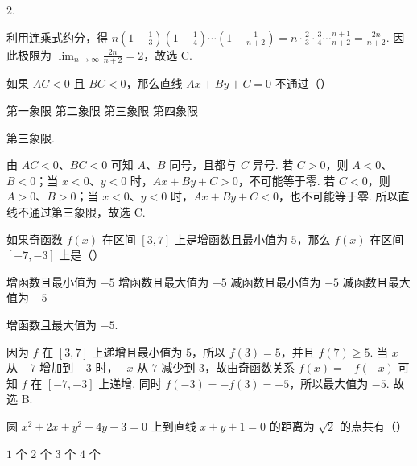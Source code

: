 \documentclass[UTF8,a4paper,oneside,11pt]{ctexbook}
\begin{document}
\begin{answer}
\(2\).
\end{answer}

\begin{solution}
利用连乘式约分，得
\(n\left(1-\frac13\right)\left(1-\frac14\right)\cdots\left(1-\frac1{n+2}\right)=n\cdot\frac23\cdot\frac34\cdots\frac{n+1}{n+2}=\frac{2n}{n+2}\). 因此极限为 \(\displaystyle\lim_{n\to\infty}\frac{2n}{n+2}=2\)，故选 C.
\end{solution}

\begin{problem}
如果 \(AC < 0\) 且 \(BC < 0\)，那么直线 \(Ax + By + C = 0\) 不通过（\quad）

\choices
    {第一象限}
    {第二象限}
    {第三象限}
    {第四象限}
\end{problem}

\begin{answer}
第三象限.
\end{answer}

\begin{solution}
由 \(AC<0\)、\(BC<0\) 可知 \(A\)、\(B\) 同号，且都与 \(C\) 异号. 若 \(C>0\)，则 \(A<0\)、\(B<0\)；当 \(x<0\)、\(y<0\) 时，\(Ax+By+C>0\)，不可能等于零. 若 \(C<0\)，则 \(A>0\)、\(B>0\)；当 \(x<0\)、\(y<0\) 时，\(Ax+By+C<0\)，也不可能等于零. 所以直线不通过第三象限，故选 C.
\end{solution}

\begin{problem}
如果奇函数 \(f(x)\) 在区间 \([3,7]\) 上是增函数且最小值为 \(5\)，那么 \(f(x)\) 在区间 \([-7,-3]\) 上是（\quad）

\choices
    {增函数且最小值为 \(-5\)}
    {增函数且最大值为 \(-5\)}
    {减函数且最小值为 \(-5\)}
    {减函数且最大值为 \(-5\)}
\end{problem}

\begin{answer}
增函数且最大值为 \(-5\).
\end{answer}

\begin{solution}
因为 \(f\) 在 \([3,7]\) 上递增且最小值为 \(5\)，所以 \(f(3)=5\)，并且 \(f(7)\geq5\). 当 \(x\) 从 \(-7\) 增加到 \(-3\) 时，\(-x\) 从 \(7\) 减少到 \(3\)，故由奇函数关系 \(f(x)=-f(-x)\) 可知 \(f\) 在 \([-7,-3]\) 上递增. 同时 \(f(-3)=-f(3)=-5\)，所以最大值为 \(-5\). 故选 B.
\end{solution}

\begin{problem}
圆 \(x^{2} + 2x + y^{2} + 4y - 3 = 0\) 上到直线 \(x + y + 1 = 0\) 的距离为 \(\sqrt{2}\) 的点共有（\quad）

\choices
    {\(1\) 个}
    {\(2\) 个}
    {\(3\) 个}
    {\(4\) 个}
\end{problem}
\end{document}
